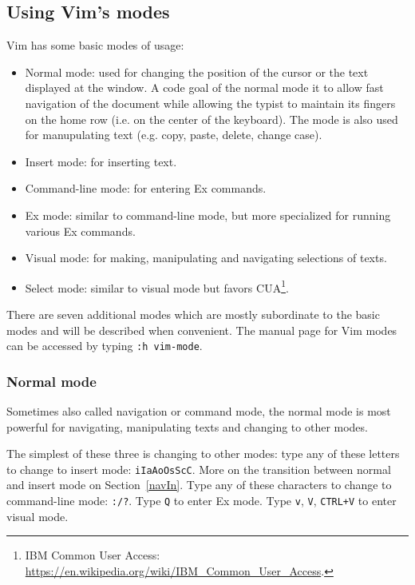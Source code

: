 \documentclass{article}
\begin{document}

\subsection{Using Vim's modes}
Vim has some basic modes of usage:
\begin{itemize}
  \item Normal mode: used for changing
  the position of the cursor or the text displayed
  at the window.
  A code goal of the normal mode it to allow fast
  navigation of the document while allowing
  the typist to maintain its fingers on the home row
  (i.e. on the center of the keyboard).
  The mode is also used for manupulating text
  (e.g. copy, paste, delete, change case).
  \item Insert mode: for inserting text.
  \item Command-line mode: for entering Ex commands.
  \item Ex mode: similar to command-line mode,
  but more specialized for running various Ex commands.
  \item Visual mode: for making, manipulating and navigating
  selections of texts.
  \item Select mode: similar to visual mode but
  favors CUA\footnote{IBM Common User Access: \url{https://en.wikipedia.org/wiki/IBM_Common_User_Access}.}.
\end{itemize}

There are seven additional modes which are mostly subordinate 
to the basic modes and will be described when convenient.
The manual page for Vim modes can be accessed by typing
\texttt{:h vim-mode}.

\subsubsection{Normal mode}
Sometimes also called navigation or command mode,
the normal mode is most powerful for
navigating, manipulating texts and changing to other modes.

The simplest of these three is changing to other modes:
type any of these letters to change to insert mode:
\texttt{iIaAoOsScC}. More on the transition between
normal and insert mode on Section~\ref{navIn}.
Type any of these characters to change to command-line mode:
\texttt{:/?}.
Type \texttt{Q} to enter Ex mode.
Type \texttt{v}, \texttt{V}, \texttt{CTRL+V} to enter visual mode.
\end{document}
